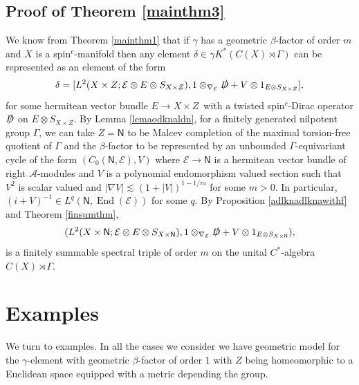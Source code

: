 \documentclass[a4paper,reqno]{amsart}
\numberwithin{equation}{section}
\def\End{\operatorname{End}}
\theoremstyle{definition}
\theoremstyle{remark}
\begin{document}
\subsection{Proof of Theorem \ref{mainthm3}}
\label{proofofthm3}


We know from Theorem \ref{mainthm1} that if $\gamma$ has a geometric $\beta$-factor of order $m$ and $X$ is a spin$^c$-manifold then any element $\delta\in \gamma K^*(C(X)\rtimes \Gamma)$ can be represented as an element of the form
$$
\delta=[L^2(X\times Z;\mathcal{E}\otimes E\otimes S_{X\times Z} ),1\otimes_{\nabla_\mathcal{E}}\slashed{D}+V\otimes 1_{E\otimes S_{X\times Z}}],$$
for some hermitean vector bundle $E\to X\times Z$ with a twisted spin$^c$-Dirac operator $\slashed{D}$ on $E\otimes S_{X\times Z}$. By Lemma \ref{lemaodknaldn}, for a finitely generated nilpotent group $\Gamma$, we can take $Z=\mathsf{N}$ to be Malcev completion of the maximal torsion-free quotient of $\Gamma$ and the $\beta$-factor to be represented by an unbounded $\Gamma$-equivariant cycle of the form $(C_0(\mathsf{N},\mathcal{E}),V)$ where $\mathcal{E}\to \mathsf{N}$ is a hermitean vector bundle of right $\mathcal{A}$-modules and $V$ is a polynomial endomorphism valued section such that $V^2$ is scalar valued and $|\nabla V|\lesssim (1+|V|)^{1-1/m}$ for some $m>0$. In particular, $(i+V)^{-1}\in L^q(\mathsf{N},\End(\mathcal{E}))$ for some $q$. By Proposition \ref{adlknadlknawithf} and Theorem \ref{finsumthm},
$$(L^2(X\times \mathsf{N};\mathcal{E}\otimes E\otimes S_{X\times \mathsf{N}} ),1\otimes_{\nabla_\mathcal{E}}\slashed{D}+V\otimes 1_{E\otimes S_{X\times \mathsf{N}}}),$$
is a finitely summable spectral triple of order $m$ on the unital $C^*$-algebra $C(X)\rtimes \Gamma$. 












\section{Examples}
\label{excxca}

We turn to examples. In all the cases we consider we have geometric model for the $\gamma$-element with geometric $\beta$-factor of order $1$ with $Z$ being homeomorphic to a Euclidean space equipped with a metric depending the group.
\end{document}

